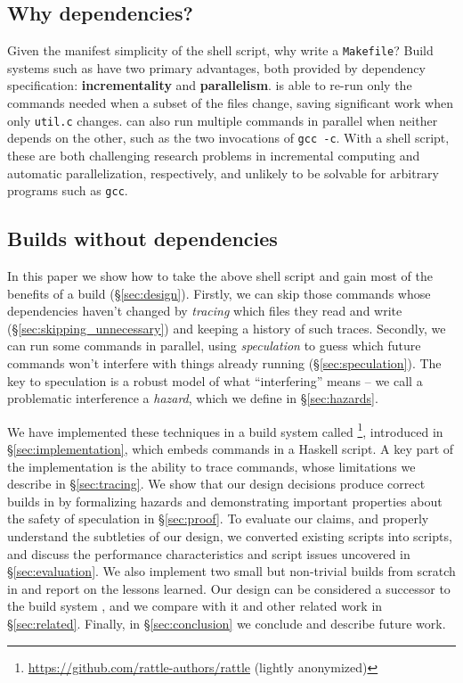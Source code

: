 \subsection{Why dependencies?}

Given the manifest simplicity of the shell script, why write a \texttt{Makefile}? Build systems such as \Make have two primary advantages, both provided by dependency specification: \textbf{incrementality} and \textbf{parallelism}. \Make is able to re-run only the commands needed when a subset of the files change, saving significant work when only \texttt{util.c} changes. \Make can also run multiple commands in parallel when neither depends on the other, such as the two invocations of \texttt{gcc -c}. With a shell script, these are both challenging research problems in incremental computing and automatic parallelization, respectively, and unlikely to be solvable for arbitrary programs such as \texttt{gcc}.

\subsection{Builds without dependencies}

In this paper we show how to take the above shell script and gain most of the benefits of a \Make build (\S\ref{sec:design}). Firstly, we can skip those commands whose dependencies haven't changed by \emph{tracing} which files they read and write (\S\ref{sec:skipping_unnecessary}) and keeping a history of such traces. Secondly, we can run some commands in parallel, using \emph{speculation} to guess which future commands won't interfere with things already running (\S\ref{sec:speculation}). The key to speculation is a robust model of what ``interfering'' means -- we call a problematic interference a \emph{hazard}, which we define in \S\ref{sec:hazards}.

We have implemented these techniques in a build system called \Rattle\footnote{\url{https://github.com/rattle-authors/rattle} (lightly anonymized)}, introduced in \S\ref{sec:implementation}, which embeds commands in a Haskell script. A key part of the implementation is the ability to trace commands, whose limitations we describe in \S\ref{sec:tracing}. We show that our design decisions produce correct builds in by formalizing hazards and demonstrating important properties about the safety of speculation in \S\ref{sec:proof}. To evaluate our claims, and properly understand the subtleties of our design, we converted existing \Make scripts into \Rattle scripts, and discuss the performance characteristics and \Make script issues uncovered in \S\ref{sec:evaluation}. We also implement two small but non-trivial builds from scratch in \Rattle and report on the lessons learned. Our design can be considered a successor to the \Memoize build system \cite{memoize}, and we compare \Rattle with it and other related work in \S\ref{sec:related}. Finally, in \S\ref{sec:conclusion} we conclude and describe future work.
